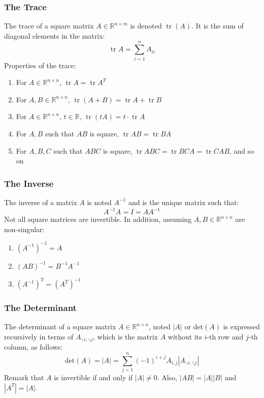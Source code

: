 \documentclass[twoside,twocolumn]{article}
\begin{document}
\subsubsection{The Trace}
The trace of a square matrix $A \in \mathbb{R}^{n \times m}$ is denoted
$\operatorname{tr}(A)$. It is the sum of diagonal elements in the matrix:
\begin{equation}
  \operatorname{tr}A = \sum_{i=1}^n A_{ii}
\end{equation}
Properties of the trace:
\begin{enumerate}
  \item For $A \in \mathbb{R}^{n \times n}$, $\operatorname{tr}A=\operatorname{tr}A^T$
  \item For $A, B \in \mathbb{R}^{n \times n}$, $\operatorname{tr}(A+B)=\operatorname{tr}A+\operatorname{tr}B$
  \item For $A \in \mathbb{R}^{n \times n}$, $t\in \mathbb{R}$, $\operatorname{tr}(tA)=t \cdot \operatorname{tr}A$
  \item For $A, B$ such that $AB$ is square, $\operatorname{tr}AB = \operatorname{tr}BA$
  \item For $A,B,C$ such that $ABC$ is square, $\operatorname{tr}ABC=\operatorname{tr}BCA = \operatorname{tr}CAB$, and so on
\end{enumerate}
\subsubsection{The Inverse}
The inverse of a matrix $A$ is noted $A^{-1}$ and is the unique matrix
such that:
\begin{equation}
  A^{-1}A=I=AA^{-1}
\end{equation}
Not all square matrices are invertible. In addition, assuming
$A, B \in \mathbb{R}^{n \times n}$ are non-singular:
\begin{enumerate}
  \item $(A^{-1})^{-1} = A$
  \item $(AB)^{-1} = B^{-1}A^{-1}$
  \item $(A^{-1})^T = (A^T)^{-1}$
\end{enumerate}
\subsubsection{The Determinant}
The determinant of a square matrix $A\in\mathbb{R}^{n\times n}$, noted $|A|$
or $\textrm{det}(A)$ is expressed recursively in terms of
$A_{\backslash i, \backslash j}$, which is the matrix $A$ without
its $i$-th row and $j$-th column, as follows:
\begin{equation}
  \textrm{det}(A)=|A|=\sum_{j=1}^n(-1)^{i+j}A_{i,j}|A_{\backslash i,\backslash j}|
\end{equation}
Remark that $A$ is invertible if and only if $|A| \not= 0$. Also, $|AB|=|A||B|$
and $|A^T|=|A|$.
\end{document}
